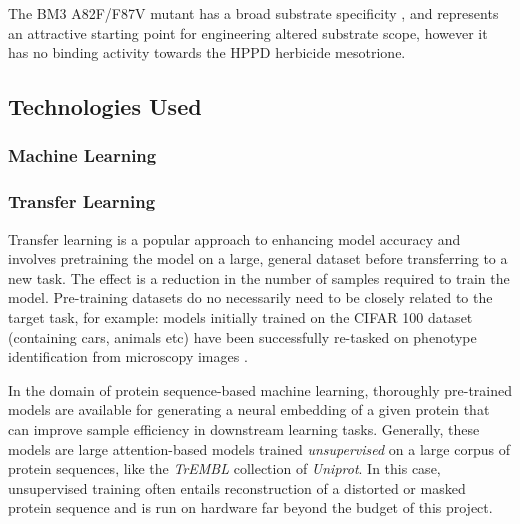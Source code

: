 \documentclass[16pt]{book}
\begin{document}
The BM3 A82F/F87V mutant has a broad substrate specificity \cite{butler2013key}, and represents an attractive starting point for engineering altered substrate scope, however it has no binding activity towards the HPPD herbicide mesotrione. %

\subsection{Technologies Used}
\subsubsection{Machine Learning}
\subsubsection{Transfer Learning}


Transfer learning is a popular approach to enhancing model accuracy and involves pretraining the model on a large, general dataset before transferring to a new task. 
The effect is a reduction in the number of samples required to train the model. 
Pre-training datasets do no necessarily need to be closely related to the target task, for example: models initially trained on the CIFAR 100 dataset (containing cars, animals etc) have been successfully re-tasked on phenotype identification from microscopy images \cite{ng2016nuts}. %

In the domain of protein sequence-based machine learning, thoroughly pre-trained models are available for generating a neural embedding of a given protein that can improve sample efficiency in downstream learning tasks.
Generally, these models are large attention-based models trained \textit{unsupervised} on a large corpus of protein sequences, like the \textit{TrEMBL} collection of \textit{Uniprot}.
In this case, unsupervised training often entails reconstruction of a distorted or masked protein sequence and is run on hardware far beyond the budget of this project.
\end{document}
